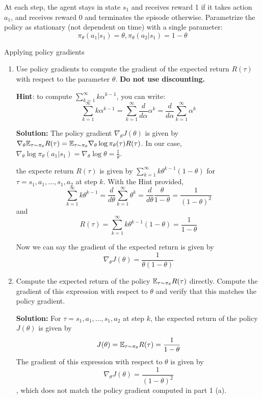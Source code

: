 \documentclass{article}
\begin{document}
At each step, the agent stays in state $s_1$ and receives reward 1 if it takes action $a_1$, and receives reward 0 and terminates the episode otherwise.
Parametrize the policy as stationary (not dependent on time) with a single parameter:
\[\pi_\theta(a_1|s_1) = \theta, \pi_\theta(a_2|s_1) = 1-\theta\]

\begin{enumerate}
 Applying policy gradients
\begin{enumerate}
    \item Use policy gradients to compute the gradient of the expected return $R(\tau)$ with respect to the parameter $\theta$. \textbf{Do not use discounting.}

    \textbf{Hint}: to compute $\sum_{k=1}^\infty k\alpha^{k-1}$, you can write:
    \[\sum_{k=1}^\infty k\alpha^{k-1} = \sum_{k=1}^\infty \frac{d}{d\alpha}\alpha^k = \frac{d}{d\alpha}\sum_{k=1}^\infty\alpha^k\]

\textbf{Solution:} The policy gradient $\nabla_\theta J(\theta)$ is given by $\nabla_\theta \mathbb{E}_{\tau\sim\pi_\theta} R(\tau) = \mathbb{E}_{\tau\sim\pi_\theta} \nabla_\theta \log \pi_\theta(\tau) R(\tau)$. In our case, $\nabla_\theta \log \pi_\theta(a_1|s_1) = \nabla_\theta \log \theta = \frac{1}{\theta}$.

the expecte return $R(\tau)$ is given by $\sum_{k=1}^\infty k\theta^{k-1}(1-\theta)$ for $\tau=s_1,a_1,\ldots,s_1,a_2$ at step $k$. With the Hint provided, \[\sum_{k=1}^\infty k\theta^{k-1} = \frac{d}{d\theta}\sum_{k=1}^\infty \theta^k = \frac{d}{d\theta}\frac{\theta}{1-\theta} = \frac{1}{{(1-\theta)}^2}\] and \[R(\tau) = \sum_{k=1}^\infty k\theta^{k-1}(1-\theta) = \frac{1}{1-\theta}\]

Now we can say the gradient of the expected return is given by \[\nabla_\theta J(\theta) = \frac{1}{\theta(1-\theta)}\]

    \item \label{exact_gradient} Compute the expected return of the policy $\mathbb{E}_{\tau \sim \pi_\theta} R(\tau)$ directly. Compute the gradient of this expression with respect to $\theta$ and verify that this matches the policy gradient.

\textbf{Solution:} For $\tau = s_1, a_1, \ldots, s_1, a_2$ at step $k$, the expected return of the policy $J(\theta)$ is given by \[J(\theta) = \mathbb{E}_{\tau\sim \pi_\theta} R(\tau) = \frac{1}{1-\theta}\] The gradient of this expression with respect to $\theta$ is given by \[\nabla_\theta J(\theta) = \frac{1}{{(1-\theta)}^2}\], which does not match the policy gradient computed in part 1 (a).


\end{enumerate}
\end{enumerate}
\end{document}
